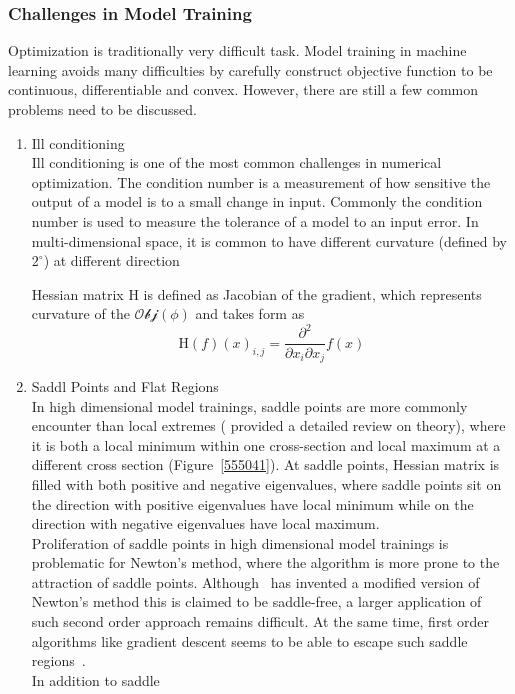 \subsubsection{Challenges in Model Training}

Optimization is traditionally very difficult task. Model training in machine learning avoids many difficulties by carefully construct objective function to be continuous, differentiable and convex. However, there are still a few common problems need to be discussed. 

\begin{enumerate}
    \item Ill conditioning\\
Ill conditioning is one of the most common challenges in numerical optimization. The condition number is a measurement of how sensitive the output of a model is to a small change in input. Commonly the condition number is used to measure the tolerance of a model to an input error.  In multi-dimensional space, it is common to have different curvature (defined by $2^\circ$) at different direction

Hessian matrix $\mathrm{H}$ is defined as Jacobian of the gradient, which represents curvature of the $\mathcal{Obj}(\phi)$ and takes form as 
\begin{equation}
    \mathrm{H}(f)(x)_{i,j} = \frac{\partial^2}{\partial x_i \partial x_j}f(x)
\end{equation}

    \item Saddl Points and Flat Regions\\
In high dimensional model trainings, saddle points are more commonly encounter than local extremes (\citet{DauphinPGCGB14} provided a detailed review on theory), where it is both a local minimum within one cross-section and local maximum at a different cross section (Figure~\ref{555041}). At saddle points, Hessian matrix is filled with both positive and negative eigenvalues, where saddle points sit on the direction with positive eigenvalues have local minimum while on the direction with negative eigenvalues have local maximum. \\
Proliferation of saddle points in high dimensional model trainings is problematic for Newton's method, where the algorithm is more prone to the attraction of saddle points. Although~\citet{DauphinPGCGB14} has invented a modified version of Newton's method this is claimed to be saddle-free, a larger application of such second order approach remains difficult. At the same time, first order algorithms like gradient descent seems to be able to escape such saddle regions~\cite{GoodfellowV14}.\\
In addition to saddle 

\end{enumerate}

